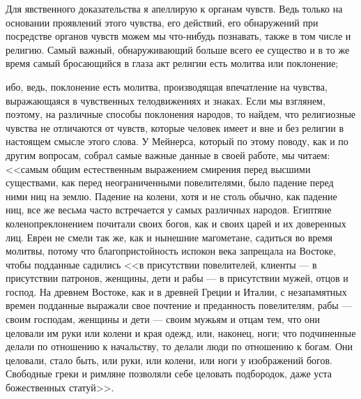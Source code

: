 \documentclass[12pt]{article}
\begin{document}
Для явственного доказательства я апеллирую к органам чувств. Ведь только на основании проявлений этого чувства, его действий, его обнаружений при посредстве органов чувств можем мы что-нибудь познавать, также в том числе и религию. Самый важный, обнаруживающий больше всего ее существо и в то же время самый бросающийся в глаза акт религии есть молитва или поклонение; 

ибо, ведь, поклонение есть молитва, производящая впечатление на чувства, выражающаяся в чувственных телодвижениях и знаках. Если мы взглянем, поэтому, на различные способы поклонения народов, то найдем, что религиозные чувства не отличаются от чувств, которые человек имеет и вне и без религии в настоящем смысле этого слова. У Мейнерса, который по этому поводу, как и по другим вопросам, собрал самые важные данные в своей работе, мы читаем: <<самым общим естественным выражением смирения перед высшими существами, как перед неограниченными повелителями, было падение перед ними ниц на землю. Падение на колени, хотя и не столь обычно, как падение ниц, все же весьма часто встречается у самых различных народов. Египтяне коленопреклонением почитали своих богов, как и своих царей и их доверенных лиц. Евреи не смели так же, как и нынешние магометане, садиться во время молитвы, потому что благопристойность испокон века запрещала на Востоке, чтобы подданные садились <<в присутствии повелителей, клиенты --- в присутствии патронов, женщины, дети и рабы --- в присутствии мужей, отцов и господ. На древнем Востоке, как и в древней Греции и Италии, с незапамятных времен подданные выражали свое почтение и преданность повелителям, рабы --- своим господам, женщины и дети --- своим мужьям и отцам тем, что они целовали им руки или колени и края одежд, или, наконец, ноги; что подчиненные делали по отношению к начальству, то делали люди по отношению к богам. Они целовали, стало быть, или руки, или колени, или ноги у изображений богов. Свободные греки и римляне позволяли себе целовать подбородок, даже уста божественных статуй>>. 
\end{document}
